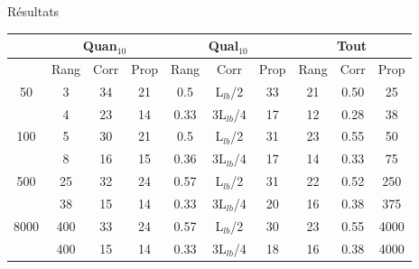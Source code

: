 \documentclass{beamer}
\begin{document}
\begin{frame}{Résultats}
\begin{tabular}{|@{}c@{}|@{}c@{}|@{}c@{}|@{}c@{}||@{}c@{}|@{}c@{}|@{}c@{}||@{}c@{}|@{}c@{}|@{}c@{}|}

\hline
 & \multicolumn{3}{c|}{Quan$_{10}$} & \multicolumn{3}{c|}{Qual$_{10}$} & \multicolumn{3}{c|}{Tout} \\
 \hline
 & Rang & Corr & Prop & Rang & Corr & Prop & Rang & Corr & Prop \\
 \hline
 50 & 3 & 34 & 21 & 0.5 & L$_{lb}$/2 & 33 & 21 & 0.50 & 25  \\
 \cline{2-10} 
    & 4 & 23 & 14 & 0.33 & 3L$_{lb}$/4 & 17 & 12 & 0.28 & 38  \\
  \hline
   100 & 5 & 30 & 21 & 0.5 & L$_{lb}$/2 & 31 & 23 & 0.55 & 50  \\
 \cline{2-10} 
    & 8 & 16 & 15 & 0.36 & 3L$_{lb}$/4 & 17 & 14 & 0.33 & 75  \\
  \hline
   500 & 25 & 32 & 24 & 0.57 & L$_{lb}$/2 & 31 & 22 & 0.52 & 250  \\
 \cline{2-10} 
    & 38 & 15 & 14 & 0.33 & 3L$_{lb}$/4 & 20 & 16 & 0.38 & 375  \\
  \hline
   8000 & 400 & 33 & 24 & 0.57 & L$_{lb}$/2 & 30 & 23 & 0.55 & 4000  \\
 \cline{2-10} 
    & 400 & 15 & 14 & 0.33 & 3L$_{lb}$/4 & 18 & 16 & 0.38 & 4000  \\
  \hline

\end{tabular}
\end{frame}
\end{document}
